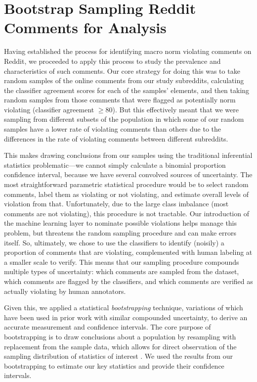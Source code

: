 \section{Bootstrap Sampling Reddit Comments for Analysis}
Having established the process for identifying macro norm violating comments on Reddit, we proceeded to apply this process to study the prevalence and characteristics of such comments. Our core strategy for doing this was to take random samples of the online comments from our study subreddits, calculating the classifier agreement scores for each of the samples’ elements, and then taking random samples from those comments that were flagged as potentially norm violating (classifier agreement $\geq 80$). But this effectively meant that we were sampling from different subsets of the population in which some of our random samples have a lower rate of violating comments than others due to the differences in the rate of violating comments between different subreddits. 

This makes drawing conclusions from our samples using the traditional inferential statistics problematic---we cannot simply calculate a binomial proportion confidence interval, because we have several convolved sources of uncertainty. The most straightforward parametric statistical procedure would be to select random comments, label them as violating or not violating, and estimate overall levels of violation from that. Unfortunately, due to the large class imbalance (most comments are not violating), this procedure is not tractable. Our introduction of the machine learning layer to nominate possible violations helps manage this problem, but threatens the random sampling procedure and can make errors itself. So, ultimately, we chose to use the classifiers to identify (noisily) a proportion of comments that are violating, complemented with human labeling at a smaller scale to verify. This means that our sampling procedure compounds multiple types of uncertainty: which comments are sampled from the dataset, which comments are flagged by the classifiers, and which comments are verified as actually violating by human annotators.

Given this, we applied a statistical \textit{bootstrapping} technique, variations of which have been used in prior work with similar compounded uncertainty, to derive an accurate measurement and confidence intervals. The core purpose of bootstrapping is to draw conclusions about a population by resampling with replacement from the sample data, which allows for direct observation of the sampling distribution of statistics of interest \cite{61_Varian, 62_Weisstein}. We used the results from our bootstrapping to estimate our key statistics and provide their confidence intervals. 

